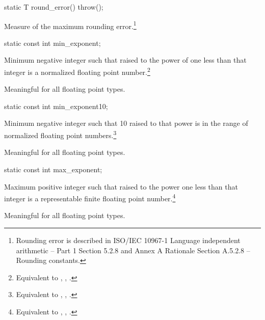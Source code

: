 \begin{itemdecl}
static T round_error() throw();
\end{itemdecl}

\begin{itemdescr}
\pnum
Measure of the maximum rounding error.\footnote{Rounding error is described in
ISO/IEC 10967-1 Language independent arithmetic -- Part 1
Section 5.2.8 and
Annex A Rationale Section A.5.2.8 -- Rounding constants.}
\end{itemdescr}

\begin{itemdecl}
static const int  min_exponent;
\end{itemdecl}

\begin{itemdescr}
\pnum
Minimum negative integer such that
raised to the power of one less than that integer is a normalized floating
point number.\footnote{Equivalent to , ,
.}

\pnum
Meaningful for all floating point types.
\end{itemdescr}

\begin{itemdecl}
static const int  min_exponent10;
\end{itemdecl}

\begin{itemdescr}
\pnum
Minimum negative integer such that 10 raised to that power is in the range
of normalized floating point numbers.\footnote{Equivalent to
, , .}

\pnum
Meaningful for all floating point types.
\end{itemdescr}

\begin{itemdecl}
static const int  max_exponent;
\end{itemdecl}

\begin{itemdescr}
\pnum
Maximum positive integer such that
raised to the power one less than that integer is a representable finite
floating point number.\footnote{Equivalent to ,
, .}

\pnum
Meaningful for all floating point types.
\end{itemdescr}

